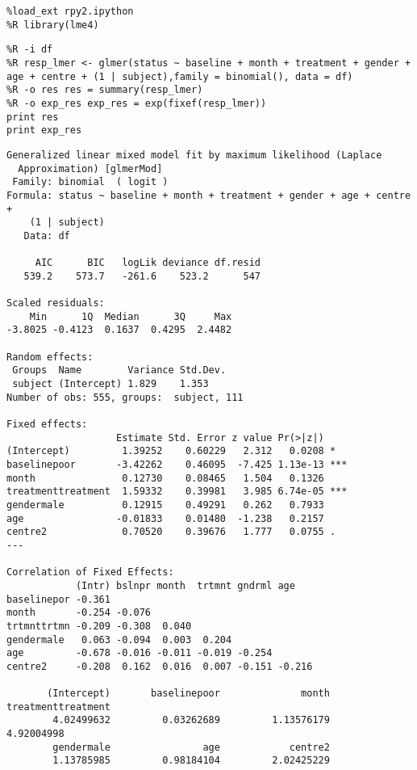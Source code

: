 \documentclass[12pt,fleqn]{article}\usepackage{../common}
\begin{document}
\begin{verbatim}
%load_ext rpy2.ipython
%R library(lme4)
\end{verbatim}


\begin{verbatim}
%R -i df 
%R resp_lmer <- glmer(status ~ baseline + month + treatment + gender + age + centre + (1 | subject),family = binomial(), data = df)
%R -o res res = summary(resp_lmer)
%R -o exp_res exp_res = exp(fixef(resp_lmer))
print res
print exp_res
\end{verbatim}

\begin{verbatim}
Generalized linear mixed model fit by maximum likelihood (Laplace
  Approximation) [glmerMod]
 Family: binomial  ( logit )
Formula: status ~ baseline + month + treatment + gender + age + centre +  
    (1 | subject)
   Data: df

     AIC      BIC   logLik deviance df.resid 
   539.2    573.7   -261.6    523.2      547 

Scaled residuals: 
    Min      1Q  Median      3Q     Max 
-3.8025 -0.4123  0.1637  0.4295  2.4482 

Random effects:
 Groups  Name        Variance Std.Dev.
 subject (Intercept) 1.829    1.353   
Number of obs: 555, groups:  subject, 111

Fixed effects:
                   Estimate Std. Error z value Pr(>|z|)    
(Intercept)         1.39252    0.60229   2.312   0.0208 *  
baselinepoor       -3.42262    0.46095  -7.425 1.13e-13 ***
month               0.12730    0.08465   1.504   0.1326    
treatmenttreatment  1.59332    0.39981   3.985 6.74e-05 ***
gendermale          0.12915    0.49291   0.262   0.7933    
age                -0.01833    0.01480  -1.238   0.2157    
centre2             0.70520    0.39676   1.777   0.0755 .  
---

Correlation of Fixed Effects:
            (Intr) bslnpr month  trtmnt gndrml age   
baselinepor -0.361                                   
month       -0.254 -0.076                            
trtmnttrtmn -0.209 -0.308  0.040                     
gendermale   0.063 -0.094  0.003  0.204              
age         -0.678 -0.016 -0.011 -0.019 -0.254       
centre2     -0.208  0.162  0.016  0.007 -0.151 -0.216

       (Intercept)       baselinepoor              month treatmenttreatment 
        4.02499632         0.03262689         1.13576179         4.92004998 
        gendermale                age            centre2 
        1.13785985         0.98184104         2.02425229 

\end{verbatim}
\end{document}

